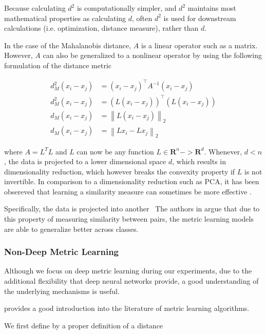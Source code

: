 \documentclass[a4paper,12pt,twoside,openright]{report}
\begin{document}
Because calculating $d^2$ is computationally simpler, and $d^2$ maintains most mathematical properties as calculating $d$, often $d^2$ is used for downstream calculations (i.e. optimization, distance measure), rather than $d$.

In the case of the Mahalanobis distance, $A$ is a linear operator such as a matrix.
However, $A$ can also be generalized to a nonlinear operator by using the following formulation of the distance metric

\begin{align}
d_{M}^{2}\left(x_{i}-x_{j}\right) &=\left(x_{i}-x_{j}\right)^{\top} A^{-1}\left(x_{i}-x_{j}\right) \\
d_{M}^{2}\left(x_{i}-x_{j}\right) &= (L\left(x_{i}-x_{j}\right))^{\top} (L\left(x_{i}-x_{j}\right)) \\
d_{M}\left(x_{i}-x_{j}\right) &=\left\|L\left(x_{i}-x_{j}\right)\right\|_{2} \\
d_{M}\left(x_{i}-x_{j}\right) &=\left\|Lx_{i}-Lx_{j}\right\|_{2}
\end{align}

where $A = L^T L$ and $L$ can now be any function $L \in \mathbf{R}^n -> \mathbf{R}^d$. 
Whenever, $d < n$, the data is projected to a lower dimensional space $d$, which results in dimensionality reduction, which however breaks the convexity property if $L$ is not invertible.
In comparison to a dimensionality reduction such as PCA, it has been obsereved that learning a similarity measure can sometimes be more effective \cite{chechik10}.

Specifically, the data is projected into another  \
The authors in \cite{moutafis17} argue that due to this property of measuring similarity between pairs, the metric learning models are able to generalize better across classes.

\subsubsection{Non-Deep Metric Learning}

Although we focus on deep metric learning during our experiments, due to the additional flexibility that deep neural networks provide, a good understanding of the underlying mechanisms is useful.

\cite{suarez19} provides a good introduction into the literature of metric learning algorithms.

We first define by a proper definition of a distance
\end{document}
